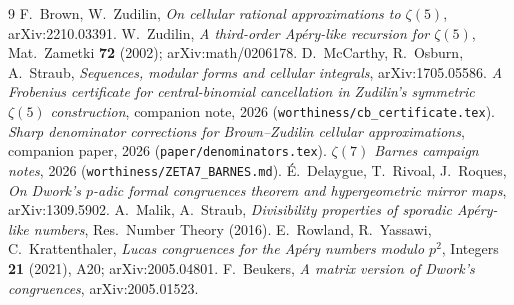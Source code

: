 \documentclass[11pt]{article}
\theoremstyle{definition}\newtheorem{remark}[theorem]{Remark}
\begin{document}
\begin{thebibliography}{9}
 F.~Brown, W.~Zudilin, \emph{On cellular rational approximations
to $\zeta(5)$}, arXiv:2210.03391.
 W.~Zudilin, \emph{A third-order Ap\'ery-like recursion for
$\zeta(5)$}, Mat.\ Zametki \textbf{72} (2002); arXiv:math/0206178.
 D.~McCarthy, R.~Osburn, A.~Straub, \emph{Sequences, modular
forms and cellular integrals}, arXiv:1705.05586.
 \emph{A Frobenius certificate for central-binomial
cancellation in Zudilin's symmetric $\zeta(5)$ construction}, companion note,
2026 (\texttt{worthiness/cb\_certificate.tex}).
 \emph{Sharp denominator corrections for Brown--Zudilin
cellular approximations}, companion paper, 2026
(\texttt{paper/denominators.tex}).
 \emph{$\zeta(7)$ Barnes campaign notes}, 2026
(\texttt{worthiness/ZETA7\_BARNES.md}).
 \'E.~Delaygue, T.~Rivoal, J.~Roques, \emph{On Dwork's $p$-adic
formal congruences theorem and hypergeometric mirror maps}, arXiv:1309.5902.
 A.~Malik, A.~Straub, \emph{Divisibility properties of
sporadic Ap\'ery-like numbers}, Res.\ Number Theory (2016).
 E.~Rowland, R.~Yassawi, C.~Krattenthaler,
\emph{Lucas congruences for the Ap\'ery numbers modulo $p^2$}, Integers
\textbf{21} (2021), A20; arXiv:2005.04801.
 F.~Beukers, \emph{A matrix version of Dwork's
congruences}, arXiv:2005.01523.
\end{thebibliography}
\end{document}
